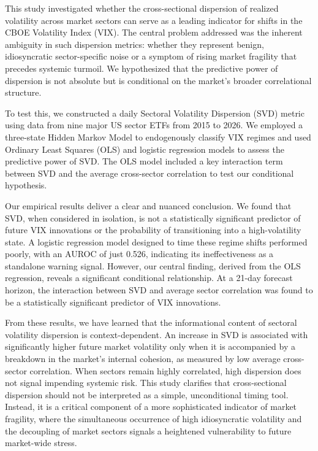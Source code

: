\documentclass[]{article}
\begin{document}
This study investigated whether the cross-sectional dispersion of realized volatility across market sectors can serve as a leading indicator for shifts in the CBOE Volatility Index (VIX). The central problem addressed was the inherent ambiguity in such dispersion metrics: whether they represent benign, idiosyncratic sector-specific noise or a symptom of rising market fragility that precedes systemic turmoil. We hypothesized that the predictive power of dispersion is not absolute but is conditional on the market's broader correlational structure.

To test this, we constructed a daily Sectoral Volatility Dispersion (SVD) metric using data from nine major US sector ETFs from 2015 to 2026. We employed a three-state Hidden Markov Model to endogenously classify VIX regimes and used Ordinary Least Squares (OLS) and logistic regression models to assess the predictive power of SVD. The OLS model included a key interaction term between SVD and the average cross-sector correlation to test our conditional hypothesis.

Our empirical results deliver a clear and nuanced conclusion. We found that SVD, when considered in isolation, is not a statistically significant predictor of future VIX innovations or the probability of transitioning into a high-volatility state. A logistic regression model designed to time these regime shifts performed poorly, with an AUROC of just 0.526, indicating its ineffectiveness as a standalone warning signal. However, our central finding, derived from the OLS regression, reveals a significant conditional relationship. At a 21-day forecast horizon, the interaction between SVD and average sector correlation was found to be a statistically significant predictor of VIX innovations.

From these results, we have learned that the informational content of sectoral volatility dispersion is context-dependent. An increase in SVD is associated with significantly higher future market volatility only when it is accompanied by a breakdown in the market's internal cohesion, as measured by low average cross-sector correlation. When sectors remain highly correlated, high dispersion does not signal impending systemic risk. This study clarifies that cross-sectional dispersion should not be interpreted as a simple, unconditional timing tool. Instead, it is a critical component of a more sophisticated indicator of market fragility, where the simultaneous occurrence of high idiosyncratic volatility and the decoupling of market sectors signals a heightened vulnerability to future market-wide stress.
\end{document}
